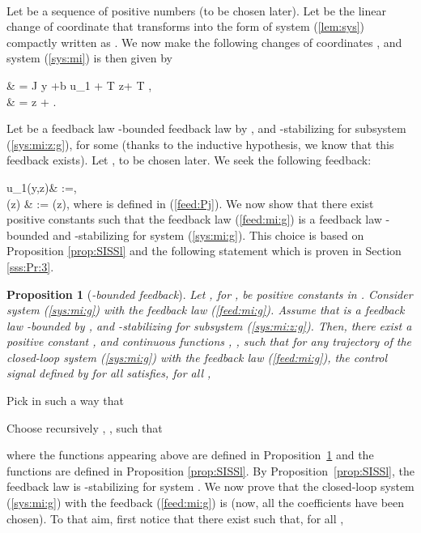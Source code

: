 \documentclass[letterpaper, 10pt]{article}
\newtheorem{propo}{Proposition}
\newcommand{\rref}[1]{(\ref{#1})}
\newcommand{\norme}[1]{\left\Vert #1\right\Vert}
\begin{document}
\paragraph{}

Let  be a sequence of positive numbers (to be chosen later). Let  be the linear change of coordinate that transforms  into the form of system \rref{lem:sys} compactly written as . We now make the following changes of coordinates , and system \rref{sys:mi} is then given by

&  = J y +b  u_1 + T z+ T , \label{sys:mi:x:g} \\
 & =   z +  . \label{sys:mi:z:g}

Let  be a feedback law -bounded feedback law by , and -stabilizing for subsystem \rref{sys:mi:z:g}, for some  (thanks to the inductive hypothesis, we know that this feedback exists). Let , to be chosen later.  We seek the following feedback:

\label{feed:mi_1}
u_1(y,z)& :=\frac{\mu(y)}{(1+\norme{z}^2)^{p}}, \\ \label{feed:mi_2}
(z) & := \kappa(z), 
 where  is defined in \rref{feed:Pj}. We now show that there exist positive constants   such that the feedback law \rref{feed:mi:g} is a feedback law -bounded and -stabilizing for system \rref{sys:mi:g}. This choice is based on Proposition \ref{prop:SISSl} and the following statement which is proven in Section \ref{sss:Pr:3}.
\begin{propo}[\emph{-bounded feedback}]
\label{prop:bound:U:mi}
Let , for , be positive constants in . Consider system \rref{sys:mi:g} with the feedback law \rref{feed:mi:g}. Assume that  is a feedback law -bounded by , and -stabilizing for subsystem \rref{sys:mi:z:g}. 
Then, there exist a positive constant , and continuous functions , , such that for any trajectory of the closed-loop system \rref{sys:mi:g} with the feedback law \rref{feed:mi:g}, the control signal  defined by  for all  satisfies, for all ,

\end{propo}
Pick  in such a way that

Choose recursively , , such that
 
where the functions  appearing above are defined in Proposition~\ref{prop:bound:U:mi} and the functions  are defined in Proposition \ref{prop:SISSl}.
By Proposition~\ref{prop:SISSl}, the feedback law  is -stabilizing for system . We now prove that the closed-loop system \rref{sys:mi:g} with the feedback \rref{feed:mi:g} is  (now, all the coefficients have been chosen). To that aim, first notice that there exist  such that, for all ,
  
\end{document}
